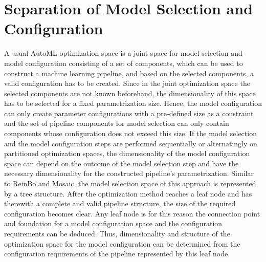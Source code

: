 \section{Separation of Model Selection and Configuration}
\label{sec:approach:separation}
A usual AutoML optimization space is a joint space for model selection and model configuration consisting of a set of components, which can be used to construct a machine learning pipeline, and based on the selected components, a valid configuration has to be created.
Since in the joint optimization space the selected components are not known beforehand, the dimensionality of this space has to be selected for a fixed parametrization size.
Hence, the model configuration can only create parameter configurations with a pre-defined size as a constraint and the set of pipeline components for model selection can only contain components whose configuration does not exceed this size.\newline
If the model selection and the model configuration steps are performed sequentially or alternatingly on partitioned optimization spaces, the dimensionality of the model configuration space can depend on the outcome of the model selection step and have the necessary dimensionality for the constructed pipeline's parametrization.\newline
Similar to ReinBo and Mosaic, the model selection space of this approach is represented by a tree structure.
After the optimization method reaches a leaf node and has therewith a complete and valid pipeline structure, the size of the required configuration becomes clear.
Any leaf node is for this reason the connection point and foundation for a model configuration space and the configuration requirements can be deduced.
Thus, dimensionality and structure of the optimization space for the model configuration can be determined from the configuration requirements of the pipeline represented by this leaf node.

